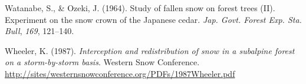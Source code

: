 \documentclass[
  letterpaper,
  DIV=11,
  numbers=noendperiod]{scrartcl}
\newlength{\cslhangindent}
\newenvironment{CSLReferences}[2] %
 {\begin{list}{}{%
  \setlength{\itemindent}{0pt}
  \setlength{\leftmargin}{0pt}
  \setlength{\parsep}{0pt}
  \ifodd #1
   \setlength{\leftmargin}{\cslhangindent}
   \setlength{\itemindent}{-1\cslhangindent}
  \fi
  \setlength{\itemsep}{#2\baselineskip}}}
 {\end{list}}
\begin{document}
\begin{CSLReferences}{1}{0}
Watanabe, S., \& Ozeki, J. (1964). {Study of fallen snow on forest trees
(II). Experiment on the snow crown of the Japanese cedar}. \emph{Jap.
Govt. Forest Exp. Sta. Bull}, \emph{169}, 121--140.

Wheeler, K. (1987). \emph{{Interception and redistribution of snow in a
subalpine forest on a storm-by-storm basis}}. Western Snow Conference.
\url{http://sites/westernsnowconference.org/PDFs/1987Wheeler.pdf}

\end{CSLReferences}
\end{document}
